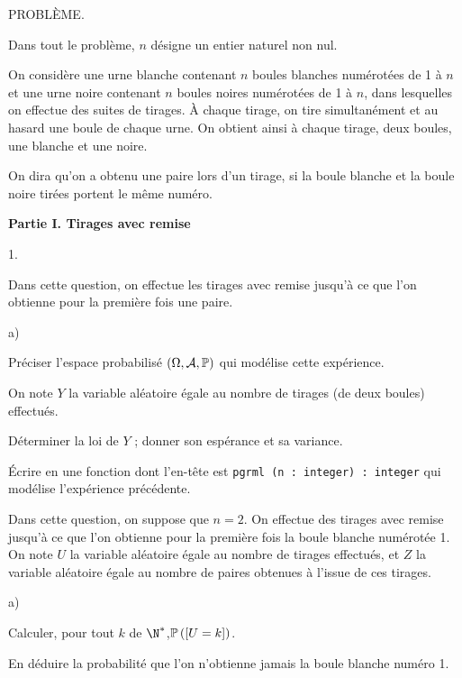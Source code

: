 \documentclass[11pt]{article}%
\begin{document}
{\Large PROBL\`{E}ME.}

Dans tout le problème, $n$ désigne un entier naturel non nul.

On considère une urne blanche contenant $n$ boules blanches numérotées
de 1 à $n$ et une urne noire contenant $n$ boules noires numérotées de
1 à $n$, dans lesquelles on effectue des suites de
tirages. \`{A} chaque tirage, on tire simultanément et au hasard une
boule de chaque urne. On obtient ainsi à chaque tirage, deux boules,
une
blanche et une noire.

On dira qu'on a obtenu une paire lors d'un tirage, si la boule blanche
et la
boule noire tirées portent le même numéro.

\textbf{Partie I. Tirages avec remise}

\begin{noliste}{1.}
 \setlength{\itemsep}{4mm}
\item Dans cette question, on effectue les tirages avec remise jusqu'à
ce que l'on obtienne pour la première fois une paire.

\begin{noliste}{a)}
 \setlength{\itemsep}{2mm}
\item Préciser l'espace probabilisé $\left(
\Omega,\mathcal{A},\mathbb{P}\right) $ qui modélise cette expérience.

\item On note $Y$ la variable aléatoire égale au nombre de tirages
(de deux boules) effectués.

Déterminer la loi de $Y$ ; donner son espérance et sa variance.
\end{noliste}

\item Écrire en \Scilab{} une fonction dont l'en-tête est \texttt{pgrml
(n : integer) : integer} qui modélise l'expérience précédente.

\item Dans cette question, on suppose que $n = 2$. On effectue des
tirages
avec remise jusqu'à ce que l'on obtienne pour la première fois la
boule blanche numérotée 1. On note $U$ la variable aléatoire 
égale au nombre de tirages effectués, et $Z$ la variable aléatoire
égale au nombre de paires obtenues à l'issue de ces tirages.

\begin{noliste}{a)}
 \setlength{\itemsep}{2mm}
\item Calculer, pour tout $k$ de $\N^{*}$,$\mathbb{P}\left(\left[ { U =
k} \right]\right) $.

En déduire la probabilité que l'on n'obtienne jamais la boule
blanche numéro 1.


\end{noliste}
\end{noliste}
\end{document}
